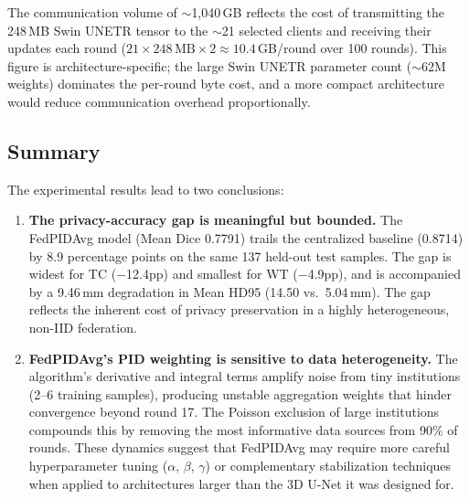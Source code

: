 \documentclass{article}
\begin{document}
The communication volume of $\sim$1,040\,GB reflects the cost of transmitting the 248\,MB Swin UNETR tensor to the $\sim$21 selected clients and receiving their updates each round ($21 \times 248\,\text{MB} \times 2 \approx 10.4$\,GB/round over 100 rounds). This figure is architecture-specific; the large Swin UNETR parameter count ($\sim$62M weights) dominates the per-round byte cost, and a more compact architecture would reduce communication overhead proportionally.

\subsection{Summary}

The experimental results lead to two conclusions:

\begin{enumerate}
    \item \textbf{The privacy-accuracy gap is meaningful but bounded.} The FedPIDAvg model (Mean Dice 0.7791) trails the centralized baseline (0.8714) by 8.9 percentage points on the same 137 held-out test samples. The gap is widest for TC ($-$12.4pp) and smallest for WT ($-$4.9pp), and is accompanied by a 9.46\,mm degradation in Mean HD95 (14.50 vs.\ 5.04\,mm). The gap reflects the inherent cost of privacy preservation in a highly heterogeneous, non-IID federation.

    \item \textbf{FedPIDAvg's PID weighting is sensitive to data heterogeneity.} The algorithm's derivative and integral terms amplify noise from tiny institutions (2--6 training samples), producing unstable aggregation weights that hinder convergence beyond round 17. The Poisson exclusion of large institutions compounds this by removing the most informative data sources from 90\% of rounds. These dynamics suggest that FedPIDAvg may require more careful hyperparameter tuning ($\alpha$, $\beta$, $\gamma$) or complementary stabilization techniques when applied to architectures larger than the 3D U-Net it was designed for.
\end{enumerate}


\end{document}
